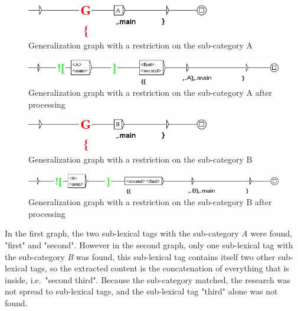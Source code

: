 \begin{figure}[!htb]
  \centering
  \includegraphics[width=8cm]{resources/img/graphe_restriction_A.png}
  \caption{Generalization graph with a restriction on the sub-category A}
  \label{fig:graphe_restriction_A}
\end{figure}

\begin{figure}[!htb]
  \centering
  \includegraphics[width=14cm]{resources/img/graphe_restriction_A_genere.png}
  \caption{Generalization graph with a restriction on the sub-category A after processing}
  \label{fig:graphe_restriction_A_genere}
\end{figure}

\begin{figure}[!htb]
  \centering
  \includegraphics[width=8cm]{resources/img/graphe_restriction_B.png}
  \caption{Generalization graph with a restriction on the sub-category B}
  \label{fig:graphe_restriction_B}
\end{figure}

\begin{figure}[!htb]
  \centering
  \includegraphics[width=14cm]{resources/img/graphe_restriction_B_genere.png}
  \caption{Generalization graph with a restriction on the sub-category B after processing}
  \label{fig:graphe_restriction_B_genere}
\end{figure}

\bigskip
\noindent In the first graph, the two sub-lexical tags with the sub-category \textit{A} were found, "first" and
"second". However in the second graph, only one sub-lexical tag with the sub-category \textit{B}
was found, this sub-lexical tag contains itself two other sub-lexical tags, so the extracted content
is the concatenation of everything that is inside, i.e.\ "second third". Because the sub-category matched,
the research was not spread to sub-lexical tags, and the sub-lexical tag "third" alone was not found.

